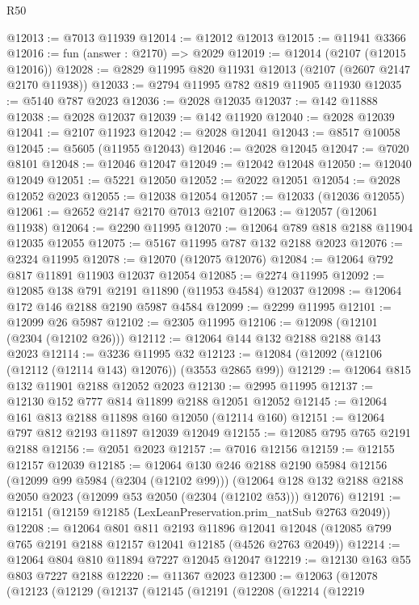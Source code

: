 \begin{lexlean}{R50}
\begin{coremodule}
@12013 := @7013 @11939
@12014 := @12012 @12013
@12015 := @11941 @3366
@12016 := fun (answer : @2170) => @2029
@12019 := @12014 (@2107 (@12015 @12016))
@12028 := @2829 @11995 @820 @11931 @12013 (@2107 (@2607 @2147 @2170 @11938))
@12033 := @2794 @11995 @782 @819 @11905 @11930
@12035 := @5140 @787 @2023
@12036 := @2028 @12035
@12037 := @142 @11888
@12038 := @2028 @12037
@12039 := @142 @11920
@12040 := @2028 @12039
@12041 := @2107 @11923
@12042 := @2028 @12041
@12043 := @8517 @10058
@12045 := @5605 (@11955 @12043)
@12046 := @2028 @12045
@12047 := @7020 @8101
@12048 := @12046 @12047
@12049 := @12042 @12048
@12050 := @12040 @12049
@12051 := @5221 @12050
@12052 := @2022 @12051
@12054 := @2028 @12052 @2023
@12055 := @12038 @12054
@12057 := @12033 (@12036 @12055)
@12061 := @2652 @2147 @2170 @7013 @2107
@12063 := @12057 (@12061 @11938)
@12064 := @2290 @11995
@12070 := @12064 @789 @818 @2188 @11904 @12035 @12055
@12075 := @5167 @11995 @787 @132 @2188 @2023
@12076 := @2324 @11995
@12078 := @12070 (@12075 @12076)
@12084 := @12064 @792 @817 @11891 @11903 @12037 @12054
@12085 := @2274 @11995
@12092 := @12085 @138 @791 @2191 @11890 (@11953 @4584) @12037
@12098 := @12064 @172 @146 @2188 @2190 @5987 @4584
@12099 := @2299 @11995
@12101 := @12099 @26 @5987
@12102 := @2305 @11995
@12106 := @12098 (@12101 (@2304 (@12102 @26)))
@12112 := @12064 @144 @132 @2188 @2188 @143 @2023
@12114 := @3236 @11995 @32
@12123 := @12084 (@12092 (@12106 (@12112 (@12114 @143) @12076)) (@3553 @2865 @99))
@12129 := @12064 @815 @132 @11901 @2188 @12052 @2023
@12130 := @2995 @11995
@12137 := @12130 @152 @777 @814 @11899 @2188 @12051 @12052
@12145 := @12064 @161 @813 @2188 @11898 @160 @12050 (@12114 @160)
@12151 := @12064 @797 @812 @2193 @11897 @12039 @12049
@12155 := @12085 @795 @765 @2191 @2188
@12156 := @2051 @2023
@12157 := @7016 @12156
@12159 := @12155 @12157 @12039
@12185 := @12064
    @130
    @246
    @2188
    @2190
    @5984
    @12156
    (@12099 @99 @5984 (@2304 (@12102 @99)))
    (@12064 @128 @132 @2188 @2188 @2050 @2023 (@12099 @53 @2050 (@2304 (@12102 @53))) @12076)
@12191 := @12151 (@12159 @12185 (LexLeanPreservation.prim_natSub @2763 @2049))
@12208 := @12064
    @801
    @811
    @2193
    @11896
    @12041
    @12048
    (@12085 @799 @765 @2191 @2188 @12157 @12041 @12185 (@4526 @2763 @2049))
@12214 := @12064 @804 @810 @11894 @7227 @12045 @12047
@12219 := @12130 @163 @55 @803 @7227 @2188
@12220 := @11367 @2023
@12300 := @12063
    (@12078
      (@12123
        (@12129
          (@12137
            (@12145
              (@12191
                (@12208
                  (@12214
                    (@12219

\end{coremodule}
\end{lexlean}
